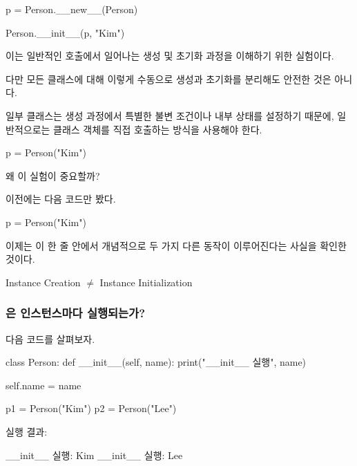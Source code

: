 \begin{dhkcode}
p = Person.__new__(Person)

Person.__init__(p, "Kim")
\end{dhkcode}

이는 일반적인  호출에서 일어나는 생성 및 초기화 과정을 이해하기 위한 실험이다.

다만 모든 클래스에 대해 이렇게 수동으로 생성과 초기화를 분리해도 안전한 것은 아니다.

일부 클래스는 생성 과정에서 특별한 불변 조건이나 내부 상태를 설정하기 때문에, 일반적으로는 클래스 객체를 직접 호출하는 방식을 사용해야 한다.

\begin{dhkcode}
p = Person("Kim")
\end{dhkcode}

\begin{dhknote}
\begin{dhksmry}[centered]
왜 이 실험이 중요할까?
\end{dhksmry}
\end{dhknote}

이전에는 다음 코드만 봤다.

\begin{dhkcode}
p = Person("Kim")
\end{dhkcode}

이제는 이 한 줄 안에서 개념적으로 두 가지 다른 동작이 이루어진다는 사실을 확인한 것이다.

\begin{dhksmry}[centered]
Instance Creation $\neq$ Instance Initialization
\end{dhksmry}

\subsubsection{은 인스턴스마다 실행되는가?}

다음 코드를 살펴보자.

\begin{dhkcode}
class Person:
    def __init__(self, name):
        print("__init__ 실행", name)

        self.name = name

p1 = Person("Kim")
p2 = Person("Lee")
\end{dhkcode}

실행 결과:

\begin{dhkzsh}
__init__ 실행: Kim
__init__ 실행: Lee
\end{dhkzsh}

